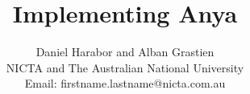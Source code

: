 \documentclass[letterpaper]{article}
\begin{document}
\title{Implementing Anya}
\author{
Daniel Harabor and Alban Grastien\\
NICTA and The Australian National University \\
Email: firstname.lastname@nicta.com.au
}
\date{}

\maketitle













\end{document}
